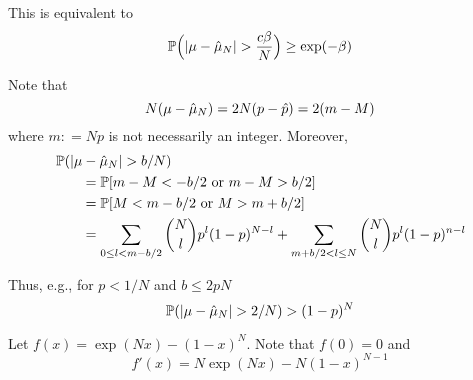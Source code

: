 \documentclass{amsart}
\begin{document}
This is equivalent to
\[
\operatorname{\mathbb{P}}\Bigl(\lvert \mu - \hat{\mu}_N \rvert > \frac{c \beta}{N} \Bigr) \ge \exp(-\beta)
\]

Note that 
\[
N(\mu - \hat{\mu}_N)  = 2N(p - \hat{p}) = 2(m - M)
\]
where $m : = Np$ is not necessarily an integer.
Moreover, 
\begin{align*}
    \MoveEqLeft \Prob(\lvert \mu - \hmu_N \rvert > b/N) \\
    &= \Prob[ m - M < -b/2 \text{ or } m - M >  b/2] \\
    &= \Prob[ M < m - b/2 \text{ or } M > m + b/2] \\
    & = \sum_{0 \le l  < m - b/2}  \binom{N}{l} p^{l}(1-p)^{N-l} 
    + \sum_{m + b/2 < l \le N}  \binom{N}{l} p^l(1-p)^{n-l}
\end{align*}

Thus, e.g., for $p < 1/N$ and $b \le 2pN $
\[
\operatorname{\mathbb{P}}(\lvert \mu - \hat{\mu}_N \rvert > 2/N) 
> (1-p)^{N} 
\]

Let $f(x) = \exp(Nx) - (1-x)^N$.  Note that $f(0) =0$ and 
\[
f'(x) = N \exp(Nx) - N(1-x)^{N-1}
\]


\end{document}
